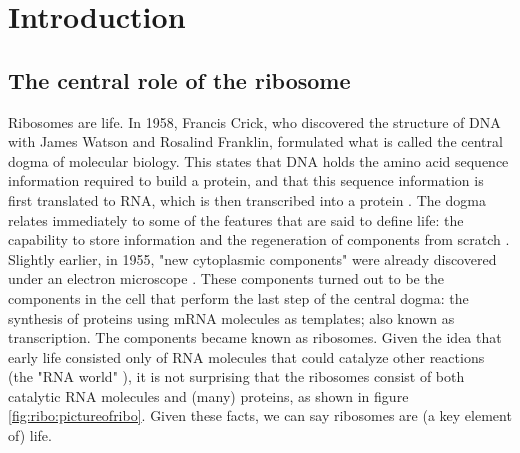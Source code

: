 
\section{Introduction}

\subsection{The central role of the ribosome}

Ribosomes are life.
%
In 1958, Francis Crick, who discovered the structure of DNA with James Watson and Rosalind Franklin,
formulated what is called the central dogma of molecular biology.
This states 
that DNA holds the amino acid sequence information required to build a protein, and that this sequence information is first translated to RNA, which is then transcribed into a protein \cite{Crick1958}.
% 
The dogma relates immediately to some of the features that are said to define life: 
the capability to store information and 
the regeneration of components from scratch \cite{Lawrence2005, Koshland2002}.
%
Slightly earlier, in 1955, "new cytoplasmic components" were already discovered under an electron microscope \cite{Palade1955}.
These components turned out to be the components in the cell that perform the last step of the central dogma: 
the synthesis of proteins using mRNA molecules as templates; also known as transcription.
The components became known as ribosomes.
%
Given the idea that early life consisted only of RNA molecules that could catalyze other reactions (the "RNA world" \cite{Campbell2002}), it is not surprising that the ribosomes 
consist of both catalytic RNA molecules and (many) proteins,
as shown in figure \ref{fig:ribo:pictureofribo}.
%
Given these facts, we can say ribosomes are (a key element of) life.


